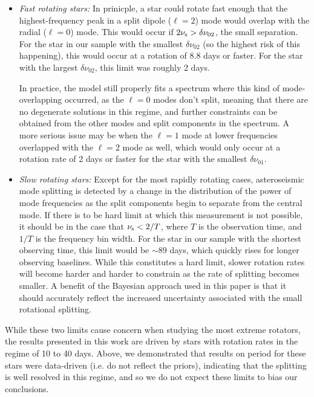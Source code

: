 \begin{itemize}
	\item \textit{Fast rotating stars:} In prinicple, a star could rotate fast enough that the highest-frequency peak in a split dipole ($\ell = 2$) mode would overlap with the radial ($\ell = 0$) mode. This would occur if $2\nu_{\rm s} > \delta\nu_{02}$, the small separation. For the star in our sample with the smallest $\delta\nu_{02}$ (so the highest risk of this happening), this would occur at a rotation of 8.8 days or faster. For the star with the largest $\delta\nu_{02}$, this limit was roughly 2 days.
	
	In practice, the model still properly fits a spectrum where this kind of mode-overlapping occurred, as the $\ell = 0$ modes don't split, meaning that there are no degenerate solutions in this regime, and further constraints can be obtained from the other modes and split components in the spectrum. A more serious issue may be when the $\ell = 1$ mode at lower frequencies overlapped with the $\ell = 2$ mode as well, which would only occur at a rotation rate of 2 days or faster for the star with the smallest $\delta\nu_{01}$.
	
	\item \textit{Slow rotating stars:} Except for the most rapidly rotating cases, asteroseismic mode splitting is detected by a change in the distribution of the power of mode frequencies as the split components begin to separate from the central mode. If there is to be hard limit at which this measurement is not possible, it should be in the case that $\nu_{\rm s} < 2/T$, where $T$ is the observation time, and $1/T$ is the frequency bin width. For the star in our sample with the shortest observing time, this limit would be $\sim 89$ days, which quickly rises for longer observing baselines. While this constitutes a hard limit, slower rotation rates will become harder and harder to constrain as the rate of splitting becomes smaller. A benefit of the Bayesian approach used in this paper is that it should accurately reflect the increased uncertainty associated with the small rotational splitting.
\end{itemize}

While these two limits cause concern when studying the most extreme rotators, the results presented in this work are driven by stars with rotation rates in the regime of 10 to 40 days. Above, we demonstrated that results on period for these stars were data-driven (i.e. do not reflect the priors), indicating that the splitting is well resolved in this regime, and so we do not expect these limits to bias our conclusions.


